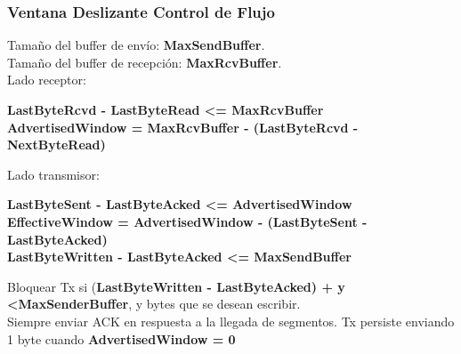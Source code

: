 \documentclass{beamer}
\begin{document}
 \begin{frame}
 		\frametitle{Ventana Deslizante Control de Flujo}
 		Tamaño del buffer de envío: \textbf{MaxSendBuffer}.\\
 		Tamaño del buffer de recepción: \textbf{MaxRcvBuffer}.\\
 		Lado receptor:
 		\begin{center}
 			\textbf{
 			LastByteRcvd - LastByteRead \textless= MaxRcvBuffer\\
 			 AdvertisedWindow = MaxRcvBuffer - (LastByteRcvd - NextByteRead)
 		}
 		\end{center}
 	Lado transmisor:
 	\begin{center}
 		\textbf{
 		LastByteSent - LastByteAcked  \textless= AdvertisedWindow\\
 		 EffectiveWindow = AdvertisedWindow - (LastByteSent - LastByteAcked)\\
 	 LastByteWritten - LastByteAcked \textless= MaxSendBuffer\\
 }\end{center}
 Bloquear Tx si (\textbf{LastByteWritten - LastByteAcked) + y \textless MaxSenderBuffer}, y
 bytes que se desean escribir.\\
 Siempre enviar ACK en respuesta a la llegada de segmentos. 
 Tx persiste enviando 1 byte cuando \textbf{AdvertisedWindow = 0} \\

 \end{frame}
 
\end{document}
